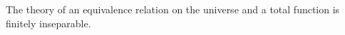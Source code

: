 The theory of an equivalence relation on the universe and a total function is finitely inseparable.
